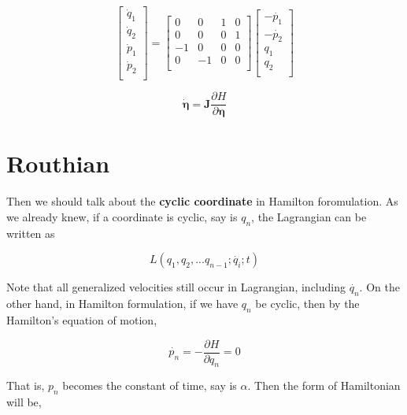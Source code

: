 \documentclass[12pt]{article}
\begin{document}
\begin{center}
    \[ \begin{bmatrix}
        \dot{q}_1\\
        \dot{q}_2\\
        \dot{p}_1\\
        \dot{p}_2\\
    \end{bmatrix} = \begin{bmatrix}
        0 & 0 & 1 & 0\\
        0 & 0 & 0 & 1\\
        -1 & 0 & 0 & 0\\
        0 & -1 & 0 & 0\\
    \end{bmatrix} \begin{bmatrix}
        -\dot{p_1}\\
        -\dot{p_2}\\
        q_1\\
        q_2\\
    \end{bmatrix} \]
\end{center}

\begin{center}
    \[ \dot{\pmb{\eta}} = \pmb{J}\frac{\partial H}{\partial \pmb{\eta}} \]
\end{center}

\section{Routhian}

Then we should talk about the \textbf{cyclic coordinate} in Hamilton foromulation. As we already knew, if a coordinate is cyclic, say is $q_n$, the Lagrangian can be written as 

\begin{center}
    \[ L(q_1, q_2, ... q_{n-1}; \dot{q_i}; t) \]
\end{center}

Note that all generalized velocities still occur in Lagrangian, including $\dot{q_n}$. On the other hand, in Hamilton formulation, if we have $q_n$ be cyclic, then by the Hamilton's equation of motion,

\begin{center}
    \[ \dot{p_n} = - \frac{\partial H}{\partial q_n}  = 0 \]
\end{center}

That is, $p_n$ becomes the constant of time, say is $\alpha$. Then the form of Hamiltonian will be,
\end{document}
